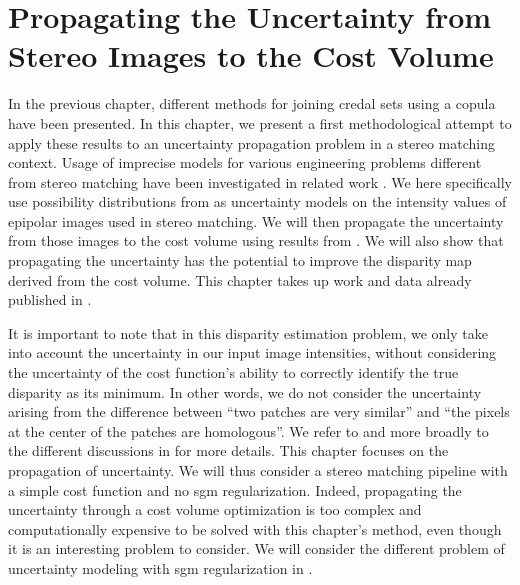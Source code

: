 \chapter{Propagating the Uncertainty from Stereo Images to the Cost Volume}\label{chap:propagating}
In the previous chapter, different methods for joining credal sets using a copula have been presented. In this chapter, we present a first methodological attempt to apply these results to an uncertainty propagation problem in a stereo matching context. Usage of imprecise models for various engineering problems different from stereo matching have been investigated in related work \cite{oberkampf_mathematical_2001,beer_imprecise_2013,patelli_integrated_2014}. We here specifically use possibility distributions from  as uncertainty models on the intensity values of epipolar images used in stereo matching. We will then propagate the uncertainty from those images to the cost volume using results from . We will also show that propagating the uncertainty has the potential to improve the disparity map derived from the cost volume. This chapter takes up work and data already published in \cite{malinowski_copulas_2022, malinowski_uncertainty_2023}.

It is important to note that in this disparity estimation problem, we only take into account the uncertainty in our input image intensities, without considering the uncertainty of the cost function's ability to correctly identify the true disparity as its minimum. In other words, we do not consider the uncertainty arising from the difference between ``two patches are very similar'' and ``the pixels at the center of the patches are homologous''. We refer to  and more broadly to the different discussions in  for more details. This chapter focuses on the propagation of uncertainty. We will thus consider a stereo matching pipeline with a simple cost function and no \acrshort{sgm} regularization. Indeed, propagating the uncertainty through a cost volume optimization is too complex and computationally expensive to be solved with this chapter's method, even though it is an interesting problem to consider. We will consider the different problem of uncertainty modeling with \acrshort{sgm} regularization in .

